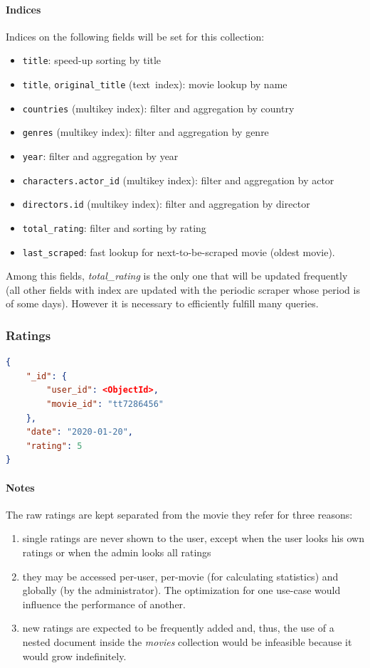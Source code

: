 \documentclass[11pt]{article}
\begin{document}
\paragraph{Indices} 
Indices on the following fields will be set for this collection:
\begin{itemize}
	\item \texttt{title}: speed-up sorting by title
	\item \texttt{title}, \texttt{original\_title} (text\ index): movie lookup 
			by name
	\item \texttt{countries} (multikey index): filter and aggregation by country
	\item \texttt{genres} (multikey index): filter and aggregation by genre
	\item \texttt{year}: filter and aggregation by year
	\item \texttt{characters.actor\_id} (multikey index): filter and aggregation by actor
	\item \texttt{directors.id} (multikey index): filter and aggregation by director
	\item \texttt{total\_rating}: filter and sorting by rating
	\item \texttt{last\_scraped}: fast lookup for next-to-be-scraped movie (oldest movie).
\end{itemize}

Among this fields, \emph{total\_rating} is the only one that will be updated 
frequently (all other fields with index are updated with the periodic scraper 
whose period is of some days). However it is necessary to efficiently fulfill 
many queries.

\subsubsection{Ratings}
\label{sec:ratings}

\begin{lstlisting}[language=json]	
{
	"_id": {
		"user_id": <ObjectId>,
		"movie_id": "tt7286456"
	},
	"date": "2020-01-20",
	"rating": 5
}
\end{lstlisting}

\paragraph{Notes}
The raw ratings are kept separated from the movie they refer for three reasons:
\begin{enumerate}
	\item single ratings are never shown to the user, except when the user 
			looks his own ratings or when the admin looks all ratings	
	\item they may be accessed per-user, per-movie (for calculating 	
			statistics) and globally (by the administrator). The optimization for one use-case would influence the performance of another.
	\item new ratings are expected to be frequently added and, thus, the use of 
		a nested document inside the \emph{movies} collection would be 
		infeasible because it would grow indefinitely. 
\end{enumerate} 
\end{document}
